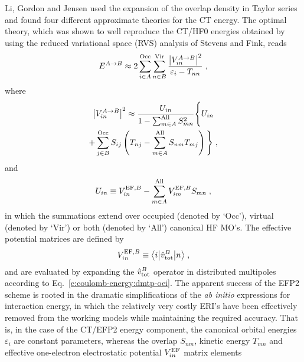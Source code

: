 \documentclass[aip,jcp,amsmath,amssymb,reprint,floatfix]{revtex4-1}
\begin{document}
Li, Gordon and Jensen used the expansion of the overlap density 
in Taylor series and found four different approximate
theories for the CT energy.\cite{Li.Gordon.Jensen.JCP.2006} 
The optimal theory, which was shown
to well reproduce the CT/HF0 energies obtained by using 
the reduced variational space (RVS)
analysis of Stevens and Fink\cite{Stevens.Fink.CPL.1987},
reads
%
\begin{equation} \label{e:u-efp2-ct}
 E^{A\rightarrow B} \approx 
 2\sum_{i\in A}^{\rm Occ}
  \sum_{n\in B}^{\rm Vir}
   \frac{ \left| V_{in}^{A\rightarrow B} \right|^2}{\varepsilon_{i} - T_{nn}} \;,
\end{equation}
%
where
%
\begin{multline} \label{e:u-efp2-ct-v2}
 \left| V_{in}^{A\rightarrow B} \right|^2 \approx
 \frac{U_{in}}{1-\sum_{m\in A}^{\rm All} S_{mn}^2}
 \Bigg\{
   U_{in} \\ + \sum_{j\in B}^{\rm Occ} S_{ij} 
   \left( 
     T_{nj} - \sum_{m\in A}^{\rm All} S_{nm} T_{mj}
   \right)
 \Bigg\} \;,
\end{multline}
%
and 
%
\begin{equation} \label{e:uin-efp2}
 U_{in} \equiv V_{in}^{{\rm EF},B} - \sum_{m\in A}^{\rm All} V_{im}^{{\rm EF},B} S_{mn} \;,
\end{equation}
%
in which the summations extend over occupied (denoted by `Occ'), virtual (denoted by `Vir') 
or both (denoted by `All') canonical HF MO's. The effective potential 
matrices are defined by
%
\begin{equation} \label{e:v-efp2-eff}
 V_{in}^{{\rm EF},B} \equiv 
 \bigl\langle {i} \bigl\lvert {\hat{v}^B_{\rm tot} } \bigl\lvert {n} \bigr\rangle \;,
\end{equation}
%
and are evaluated by expanding the $\hat{v}^B_{\rm tot}$ operator
in distributed multipoles according to Eq.~\eqref{e:coulomb-energy:dmtp-oei}.
The apparent success of the EFP2 scheme is rooted in the dramatic simplifications of the
\emph{ab initio} expressions for interaction energy, in which
the relatively very costly ERI's
have been effectively removed from the working models while maintaining the required accuracy. 
That is, in the case of the CT/EFP2 energy component, 
the canonical orbital energies $\varepsilon_i$ are
constant parameters, whereas the overlap $S_{nm}$, kinetic energy $T_{mn}$ and effective
one\hyp{}electron electrostatic potential $V_{in}^{{\rm EF}}$ matrix elements
\end{document}
